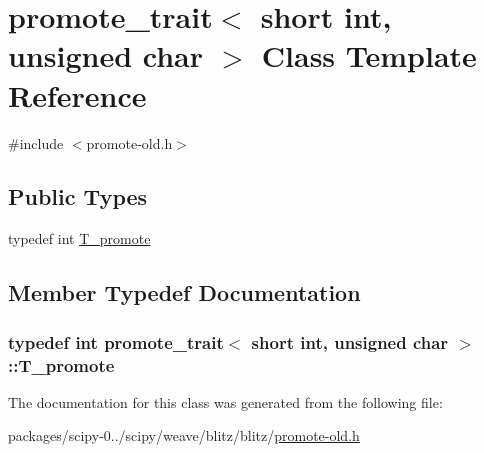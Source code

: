 \hypertarget{classpromote__trait_3_01short_01int_00_01unsigned_01char_01_4}{}\section{promote\+\_\+trait$<$ short int, unsigned char $>$ Class Template Reference}
\label{classpromote__trait_3_01short_01int_00_01unsigned_01char_01_4}


{\ttfamily \#include $<$promote-\/old.\+h$>$}

\subsection*{Public Types}
\begin{DoxyCompactItemize}
\item 
typedef int \hyperlink{classpromote__trait_3_01short_01int_00_01unsigned_01char_01_4_ae5baba41acabc9d8742a0c19b0e22359}{T\+\_\+promote}
\end{DoxyCompactItemize}


\subsection{Member Typedef Documentation}
\hypertarget{classpromote__trait_3_01short_01int_00_01unsigned_01char_01_4_ae5baba41acabc9d8742a0c19b0e22359}{}
\subsubsection[{T\+\_\+promote}]{\setlength{\rightskip}{0pt plus 5cm}typedef int {\bf promote\+\_\+trait}$<$ short int, unsigned char $>$\+::{\bf T\+\_\+promote}}\label{classpromote__trait_3_01short_01int_00_01unsigned_01char_01_4_ae5baba41acabc9d8742a0c19b0e22359}


The documentation for this class was generated from the following file\+:\begin{DoxyCompactItemize}
\item 
packages/scipy-\/0../scipy/weave/blitz/blitz/\hyperlink{promote-old_8h}{promote-\/old.\+h}\end{DoxyCompactItemize}
